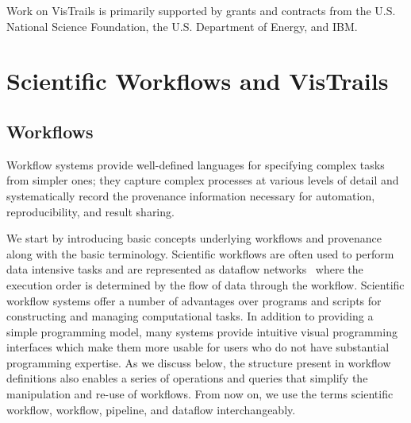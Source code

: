\documentclass[12pt]{iopart}
\begin{document}
Work on VisTrails is primarily supported by grants and contracts from
the U.S. National Science Foundation, the U.S. Department of Energy,
and IBM.

\appendix

\section{Scientific Workflows and VisTrails}


\subsection{ Workflows}

Workflow systems provide well-defined languages for specifying complex
tasks from simpler ones; they capture complex processes at various
levels of detail and systematically record the provenance information
necessary for automation, reproducibility, and result sharing.

We start by introducing basic concepts underlying
workflows and provenance along with the basic terminology.
Scientific workflows are often used to perform data intensive tasks
and are represented as dataflow networks~\cite{lee@ieee1995} where the
execution order is determined by the flow of data through the
workflow. Scientific workflow systems offer a number of advantages
over programs and scripts for constructing and
managing computational tasks. In addition to providing a simple
programming model, many systems provide intuitive visual programming
interfaces which make them more usable for users who do not have
substantial programming expertise. As we discuss below, the structure
present in workflow definitions also enables a series of operations
and queries that simplify the manipulation and re-use of workflows.
From now on, we use the terms scientific workflow, workflow, pipeline,
and dataflow interchangeably.
\end{document}

